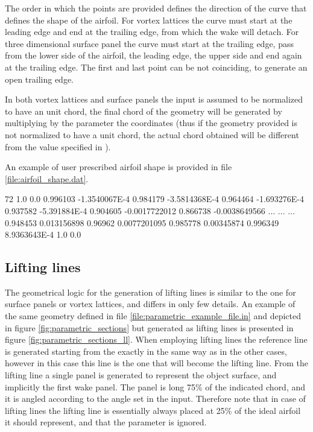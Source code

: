 The order in which the points are provided defines the direction of the curve that defines the shape of the airfoil. For vortex lattices the curve must start at the leading edge and end at the trailing edge, from which the wake will detach. For three dimensional surface panel the curve must start at the trailing edge, pass from the lower side of the airfoil, the leading edge, the upper side and end again at the trailing edge. The first and last point can be not coinciding, to generate an open trailing edge. 

In both vortex lattices and surface panels the input is assumed to be normalized to have an unit chord, the final chord of the geometry will be generated by multiplying by the  parameter the coordinates (thus if the geometry provided is not normalized to have a unit chord, the actual chord obtained will be different from the value specified in ).

An example of user prescribed airfoil shape is provided in file \ref{file:airfoil_shape.dat}.

\begin{inputfile}[frame=single, caption={Example of user specified airfoil shape (the middle lines have been suppressed for brevity)}, label={file:airfoil_shape.dat}]
72
1.0      0.0   
0.996103      -1.3540067E-4   
0.984179      -3.5814368E-4   
0.964464      -1.693276E-4   
0.937582      -5.391884E-4   
0.904605      -0.0017722012   
0.866738      -0.0038649566   
...
...
...
0.948453      0.013156898   
0.96962      0.0077201095   
0.985778      0.00345874   
0.996349      8.9363643E-4   
1.0      0.0   
\end{inputfile}

\subsection{Lifting lines}

The geometrical logic for the generation of lifting lines is similar to the one for surface panels or vortex lattices, and differs in only few details. An example of the same geometry defined in file \ref{file:parametric_example_file.in} and depicted in figure \ref{fig:parametric_sections} but generated as lifting lines is presented in figure \ref{fig:parametric_sections_ll}. When employing lifting lines the reference line is generated starting from the  exactly in the same way as in the other cases, however in this case this line is the one that will become the lifting line. From the lifting line a single panel is generated to represent the object surface, and implicitly the first wake panel. The panel is long 75\% of the indicated chord, and it is angled according to the  angle set in the input. Therefore note that in case of lifting lines the lifting line is essentially always placed at 25\% of the ideal airfoil it should represent, and that the parameter  is ignored. 

